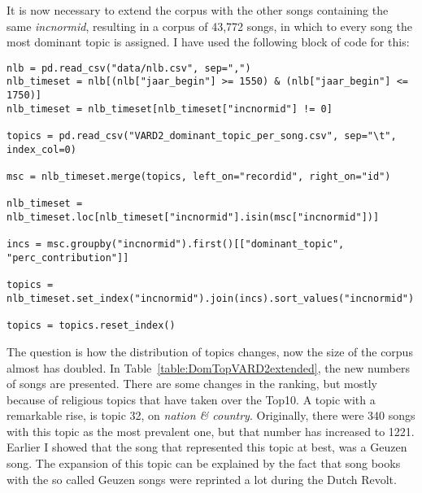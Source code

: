 It is now necessary to extend the corpus with the other songs containing the same \textit{incnormid}, resulting in a corpus of 43,772 songs, in which to every song the most dominant topic is assigned. I have used the following block of code for this:

\begin{lstlisting}
nlb = pd.read_csv("data/nlb.csv", sep=",")
nlb_timeset = nlb[(nlb["jaar_begin"] >= 1550) & (nlb["jaar_begin"] <= 1750)]
nlb_timeset = nlb_timeset[nlb_timeset["incnormid"] != 0] 

topics = pd.read_csv("VARD2_dominant_topic_per_song.csv", sep="\t", index_col=0)

msc = nlb_timeset.merge(topics, left_on="recordid", right_on="id")

nlb_timeset = nlb_timeset.loc[nlb_timeset["incnormid"].isin(msc["incnormid"])]

incs = msc.groupby("incnormid").first()[["dominant_topic", "perc_contribution"]]

topics = nlb_timeset.set_index("incnormid").join(incs).sort_values("incnormid")

topics = topics.reset_index()
\end{lstlisting}

\noindent The question is how the distribution of topics changes, now the size of the corpus almost has doubled. In Table~\ref{table:DomTopVARD2extended}, the new numbers of songs are presented. There are some changes in the ranking, but mostly because of religious topics that have taken over the Top10. A topic with a remarkable rise, is topic 32, on \textit{nation \& country}. Originally, there were 340 songs with this topic as the most prevalent one, but that number has increased to 1221. Earlier I showed that the song that represented this topic at best, was a Geuzen song. The expansion of this topic can be explained by the fact that song books with the so called Geuzen songs were reprinted a lot during the Dutch Revolt.

